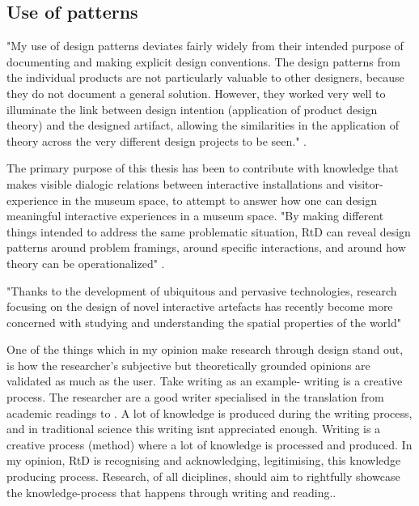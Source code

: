 

\subsection{Use of patterns}
"My use of design patterns deviates fairly widely from their intended purpose of documenting and making explicit design conventions. The design patterns from the individual products are not particularly valuable to other designers, because they do not document a general solution. However, they worked very well to illuminate the link between design intention (application of product design theory) and the designed artifact, allowing the similarities in the application of theory across the very different design projects to be seen." \autocite[p. 402]{zimmerman_designing_2009}.

The primary purpose of this thesis has been to contribute with knowledge that makes visible dialogic relations between interactive installations and visitor-experience in the museum space, to attempt to answer how one can design meaningful interactive experiences in a museum space. "By making different things intended to address the same problematic situation, RtD can reveal design patterns \autocite{Alexander_book} around problem framings, around specific interactions, and around how theory can be operationalized" \autocite[p. 178]{zimmerman_research_2014}.


"Thanks to the development of ubiquitous and pervasive technologies, research focusing on the design of novel interactive artefacts has recently become more concerned with studying and understanding the spatial properties of the world" \autocite[p. 159]{hybridplace_ciolfi}


One of the things which in my opinion make research through design stand out, is how the researcher's subjective but theoretically grounded opinions are validated as much as the user. Take writing as an example- writing is a creative process. The researcher are a good writer specialised in the translation from academic readings to . A lot of knowledge is produced during the writing process, and in traditional science this writing isnt appreciated enough. Writing is a creative process (method) where a lot of knowledge is processed and produced. In my opinion, RtD is recognising and acknowledging, legitimising, this knowledge producing process. Research, of all diciplines, should aim to rightfully showcase the knowledge-process that happens through writing and reading..


